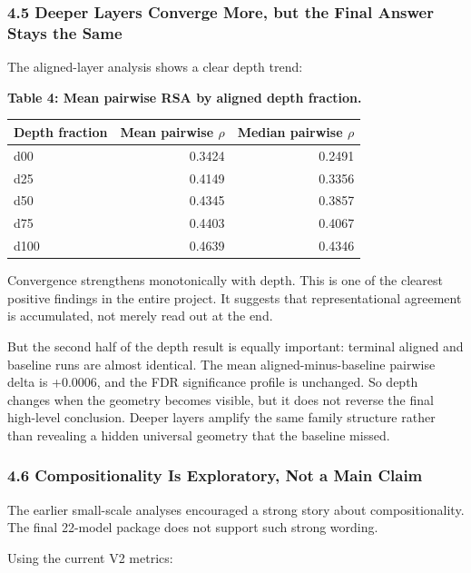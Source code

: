 \documentclass[
]{article}
\newcounter{none} %
\begin{document}
\subsubsection{4.5 Deeper Layers Converge More, but the Final Answer
Stays the
Same}\label{deeper-layers-converge-more-but-the-final-answer-stays-the-same}

The aligned-layer analysis shows a clear depth trend:

\textbf{Table 4: Mean pairwise RSA by aligned depth fraction.}

{\def\LTcaptype{none} %
\begin{longtable}[]{@{}lrr@{}}
\toprule\noalign{}
Depth fraction & Mean pairwise \(\rho\) & Median pairwise \(\rho\) \\
\midrule\noalign{}
\endhead
\bottomrule\noalign{}
\endlastfoot
d00 & 0.3424 & 0.2491 \\
d25 & 0.4149 & 0.3356 \\
d50 & 0.4345 & 0.3857 \\
d75 & 0.4403 & 0.4067 \\
d100 & 0.4639 & 0.4346 \\
\end{longtable}
}

Convergence strengthens monotonically with depth. This is one of the
clearest positive findings in the entire project. It suggests that
representational agreement is accumulated, not merely read out at the
end.

But the second half of the depth result is equally important: terminal
aligned and baseline runs are almost identical. The mean
aligned-minus-baseline pairwise delta is +0.0006, and the FDR
significance profile is unchanged. So depth changes when the geometry
becomes visible, but it does not reverse the final high-level
conclusion. Deeper layers amplify the same family structure rather than
revealing a hidden universal geometry that the baseline missed.

\subsubsection{4.6 Compositionality Is Exploratory, Not a Main
Claim}\label{compositionality-is-exploratory-not-a-main-claim}

The earlier small-scale analyses encouraged a strong story about
compositionality. The final 22-model package does not support such
strong wording.

Using the current V2 metrics:
\end{document}
